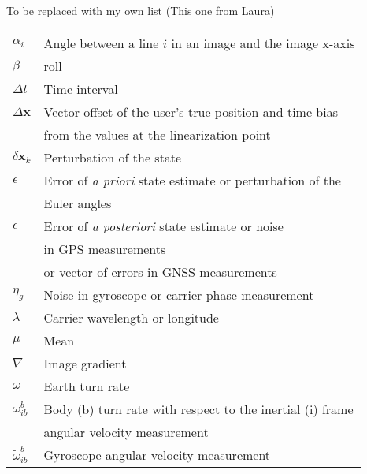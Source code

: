 ﻿To be replaced with my own list (This one from Laura)\\
\begin{tabular}{l@{\hspace{3cm}}l}
$\alpha_i$ & Angle between a line $i$ in an image and the image x-axis\\[2.0ex]
$\beta$ & roll\\[2.0ex]
$\Delta t$ & Time interval\\[2.0ex]
$\Delta \mathbf x$ & Vector offset of the user's true position and time bias\\[0.5ex]
{} & from the values at the linearization point\\[2.0ex]
$\delta \mathbf x_k$ & Perturbation of the state\\[2.0ex]
$\epsilon^-$ & Error of \textit{a priori} state estimate or perturbation of the\\[0.5ex]
{} & Euler angles\\[2.0ex]
$\epsilon$ & Error of \textit{a posteriori} state estimate or noise\\[0.5ex]
{} & in GPS measurements \\[0.5ex]
{} & or vector of errors in GNSS measurements\\[2.0ex]
$\eta_g$ & Noise in gyroscope or carrier phase measurement\\[2.0ex]
$\lambda$ & Carrier wavelength or longitude\\[2.0ex]
$\mu$ & Mean\\[2.0ex]
$\nabla$ & Image gradient\\[2.0ex]
$\omega$ & Earth turn rate\\[2.0ex]
$\omega_{ib}^b$ & Body (b) turn rate with respect to the inertial (i) frame\\[0.5ex]
{} & angular velocity measurement\\[2.0ex]
$\tilde\omega_{ib}^b$ & Gyroscope angular velocity measurement\\[2.0ex]
\end{tabular}

